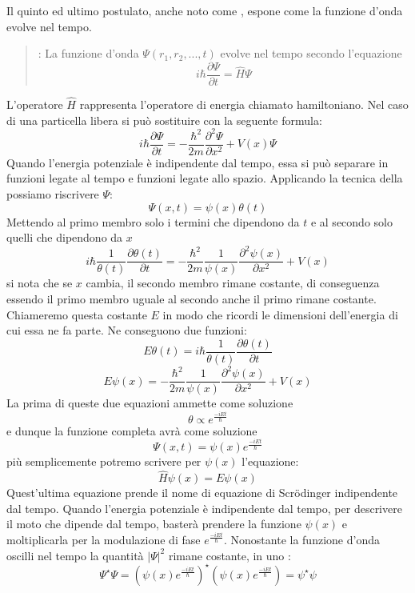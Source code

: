 Il quinto ed ultimo postulato, anche noto come , espone come la funzione d'onda evolve nel tempo.
\begin{quote}
  : La funzione d'onda $\Psi(r_1, r_2, ..., t)$ evolve nel tempo secondo l'equazione
  $$i\hbar \frac{\partial \Psi}{\partial t} = \hat{H} \Psi$$
\end{quote}
L'operatore $\hat{H}$ rappresenta l'operatore di energia chiamato hamiltoniano. Nel caso di una particella libera si può sostituire con la seguente formula:
$$i \hbar \frac{\partial \Psi}{\partial t} = - \frac{\hbar^2}{2 m} \frac{\partial^2 \Psi}{\partial x^2} + V(x) \Psi$$
Quando l'energia potenziale è indipendente dal tempo, essa si può separare in funzioni legate al tempo e funzioni legate allo spazio. Applicando la tecnica della  possiamo riscrivere $\Psi$:
$$\Psi(x, t) = \psi(x) \theta(t)$$
Mettendo al primo membro solo i termini che dipendono da $t$ e al secondo solo quelli che dipendono da $x$
$$i \hbar \frac{1}{\theta(t)} \frac{\partial \theta(t)}{\partial t} = - \frac{\hbar^2}{2 m} \frac{1}{\psi(x)} \frac{\partial^2 \psi(x)}{\partial x^2} + V(x)$$
si nota che se $x$ cambia, il secondo membro rimane costante, di conseguenza essendo il primo membro uguale al secondo anche il primo rimane costante. Chiameremo questa costante $E$ in modo che ricordi le dimensioni dell'energia di cui essa ne fa parte. Ne conseguono due funzioni:
$$E \theta(t) = i \hbar \frac{1}{\theta(t)} \frac{\partial \theta(t)}{\partial t}$$
$$E \psi(x) = - \frac{\hbar^2}{2 m} \frac{1}{\psi(x)} \frac{\partial^2 \psi(x)}{\partial x^2} + V(x)$$
La prima di queste due equazioni ammette come soluzione
$$\theta \propto e^{\frac{-i E t}{\hbar}}$$
e dunque la funzione completa avrà come soluzione
$$\Psi(x, t) = \psi(x) e^{\frac{-i E t}{\hbar}}$$
più semplicemente potremo scrivere per $\psi(x)$ l'equazione:
$$\hat{H} \psi(x) = E \psi(x)$$
Quest'ultima equazione prende il nome di equazione di Scr\"odinger indipendente dal tempo.
Quando l'energia potenziale è indipendente dal tempo, per descrivere il moto che dipende dal tempo, basterà prendere la funzione $\psi(x)$ e moltiplicarla per la modulazione di fase $e^{\frac{-i E t}{\hbar}}$. Nonostante la funzione d'onda oscilli nel tempo la quantità ${\left|\Psi\right|}^2$ rimane costante, in uno :
$$\Psi^{\star} \Psi = {\left(\psi(x) e^{\frac{-i E t}{\hbar}}\right)}^{\star} \left(\psi(x) e^{\frac{-i E t}{\hbar}}\right) = \psi^{\star} \psi$$
